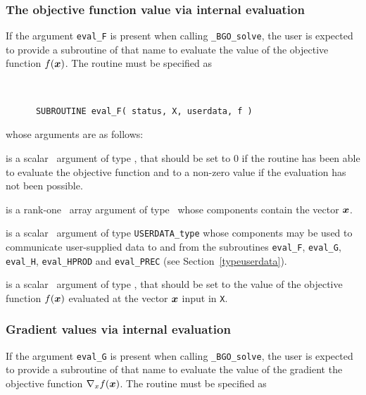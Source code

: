 \documentclass{galahad}
\newcommand{\packagename}{BGO}
\newcommand{\fullpackagename}{\libraryname\_\packagename}
\newcommand{\solver}{{\tt \fullpackagename\_solve}}
\begin{document}

\subsubsection{The objective function value via internal evaluation\label{ffv}}

If the argument {\tt eval\_F} is present when calling \solver, the
user is expected to provide a subroutine of that name to evaluate the
value of the objective function $f({\bm{x}})$.
The routine must be specified as

\def\baselinestretch{0.8}
{\tt
\begin{verbatim}
      SUBROUTINE eval_F( status, X, userdata, f )
\end{verbatim}
}
\def\baselinestretch{1.0}
\noindent whose arguments are as follows:

\begin{description}
 is a scalar \intentout\ argument of type \integer,
that should be set to 0 if the routine has been able to evaluate
the objective function
and to a non-zero value if the evaluation has not been possible.

 is a rank-one \intentin\ array argument of type \realdp\
whose components contain the vector ${\bm{x}}$.

 is a scalar \intentinout\ argument of type
{\tt USERDATA\_type} whose components may be used
to communicate user-supplied data to and from the
subroutines {\tt eval\_F}, {\tt eval\_G},
{\tt eval\_H}, {\tt eval\_HPROD} and {\tt eval\_PREC}
(see Section~\ref{typeuserdata}).

 is a scalar \intentout\ argument of type \realdp,
that should be set to the value of the objective function $f({\bm{x}})$
evaluated at the vector ${\bm{x}}$ input in {\tt X}.

\end{description}


\subsubsection{Gradient values via internal evaluation\label{gfv}}

If the argument {\tt eval\_G} is present when calling \solver, the
user is expected to provide a subroutine of that name to evaluate the
value of the gradient the objective function $\nabla_x f({\bm{x}})$.
The routine must be specified as
\end{document}
